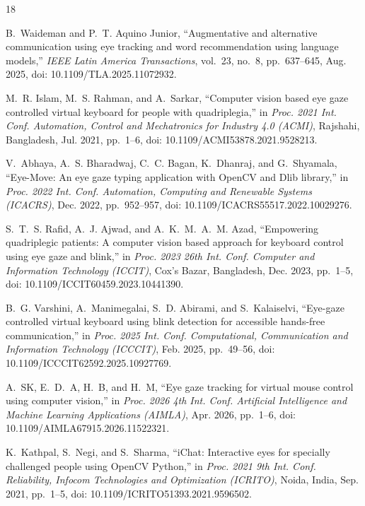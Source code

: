 \documentclass[conference]{IEEEtran}
\begin{document}
\begin{thebibliography}{18}
\footnotesize

B.~Waideman and P.~T. Aquino Junior, ``Augmentative and alternative
communication using eye tracking and word recommendation using language
models,'' \emph{IEEE Latin America Transactions}, vol.~23, no.~8, pp.~637--645,
Aug. 2025, doi: 10.1109/TLA.2025.11072932.

M.~R. Islam, M.~S. Rahman, and A.~Sarkar, ``Computer vision based eye gaze
controlled virtual keyboard for people with quadriplegia,'' in \emph{Proc. 2021
Int. Conf. Automation, Control and Mechatronics for Industry 4.0 (ACMI)},
Rajshahi, Bangladesh, Jul. 2021, pp.~1--6,
doi: 10.1109/ACMI53878.2021.9528213.

V.~Abhaya, A.~S. Bharadwaj, C.~C. Bagan, K.~Dhanraj, and G.~Shyamala,
``Eye-Move: An eye gaze typing application with OpenCV and Dlib library,'' in
\emph{Proc. 2022 Int. Conf. Automation, Computing and Renewable Systems
(ICACRS)}, Dec. 2022, pp.~952--957, doi: 10.1109/ICACRS55517.2022.10029276.

S.~T.~S. Rafid, A.~J. Ajwad, and A.~K.~M.~A.~M. Azad, ``Empowering quadriplegic
patients: A computer vision based approach for keyboard control using eye gaze
and blink,'' in \emph{Proc. 2023 26th Int. Conf. Computer and Information
Technology (ICCIT)}, Cox's Bazar, Bangladesh, Dec. 2023, pp.~1--5,
doi: 10.1109/ICCIT60459.2023.10441390.

B.~G. Varshini, A.~Manimegalai, S.~D. Abirami, and S.~Kalaiselvi, ``Eye-gaze
controlled virtual keyboard using blink detection for accessible hands-free
communication,'' in \emph{Proc. 2025 Int. Conf. Computational, Communication
and Information Technology (ICCCIT)}, Feb. 2025, pp.~49--56,
doi: 10.1109/ICCCIT62592.2025.10927769.

A.~SK, E.~D.~A, H.~B, and H.~M, ``Eye gaze tracking for virtual mouse control
using computer vision,'' in \emph{Proc. 2026 4th Int. Conf. Artificial
Intelligence and Machine Learning Applications (AIMLA)}, Apr. 2026, pp.~1--6,
doi: 10.1109/AIMLA67915.2026.11522321.

K.~Kathpal, S.~Negi, and S.~Sharma, ``iChat: Interactive eyes for specially
challenged people using OpenCV Python,'' in \emph{Proc. 2021 9th Int. Conf.
Reliability, Infocom Technologies and Optimization (ICRITO)}, Noida, India,
Sep. 2021, pp.~1--5, doi: 10.1109/ICRITO51393.2021.9596502.


\end{thebibliography}
\end{document}
